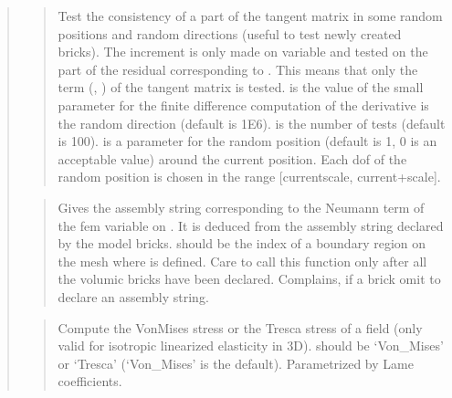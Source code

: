\documentclass[a4paper,11pt,english]{sphinxmanual}
\begin{document}
\begin{quote}
\begin{quote}

Test the consistency of a part of the tangent matrix in some
random positions and random directions
(useful to test newly created bricks).
The increment is only made on variable  and tested on the
part of the residual corresponding to . This means that
only the term (, ) of the tangent matrix is tested.
 is the value of the small parameter for the finite difference
computation of the derivative is the random direction (default is 1E\sphinxhyphen{}6).
 is the number of tests (default is 100).  is a parameter
for the random position (default is 1, 0 is an acceptable value)
around the current position.
Each dof of the random position is chosen in the range
{[}current\sphinxhyphen{}scale, current+scale{]}.
\end{quote}

\begin{quote}

Gives the assembly string corresponding to the Neumann term of
the fem variable  on . It is deduced from the
assembly string declared by the model bricks.
 should be the index of a boundary region
on the mesh where  is defined. Care to call this function
only after all the volumic bricks have been declared.
Complains, if a brick
omit to declare an assembly string.
\end{quote}

\begin{quote}

Compute the Von\sphinxhyphen{}Mises stress or the Tresca stress of a field (only
valid for isotropic linearized elasticity in 3D).  should
be  ‘Von\_Mises’ or ‘Tresca’ (‘Von\_Mises’ is the default).
Parametrized by Lame coefficients.
\end{quote}


\end{quote}
\end{document}
